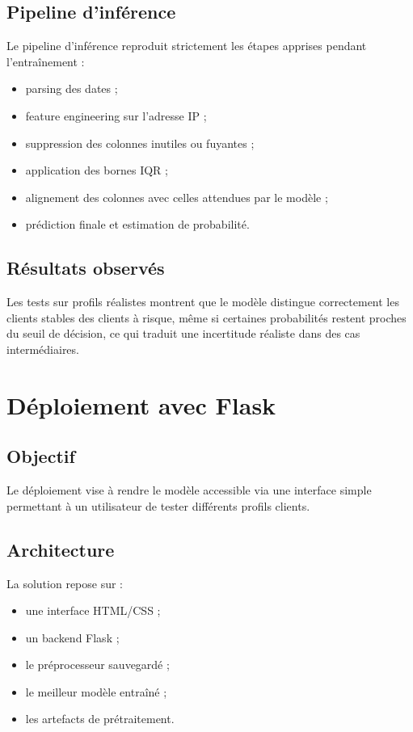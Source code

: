 \documentclass[11pt,a4paper]{article}
\begin{document}
\subsection{Pipeline d’inférence}
Le pipeline d’inférence reproduit strictement les étapes apprises pendant l’entraînement :
\begin{itemize}
    \item parsing des dates ;
    \item feature engineering sur l’adresse IP ;
    \item suppression des colonnes inutiles ou fuyantes ;
    \item application des bornes IQR ;
    \item alignement des colonnes avec celles attendues par le modèle ;
    \item prédiction finale et estimation de probabilité.
\end{itemize}

\subsection{Résultats observés}
Les tests sur profils réalistes montrent que le modèle distingue correctement les clients stables des clients à risque, même si certaines probabilités restent proches du seuil de décision, ce qui traduit une incertitude réaliste dans des cas intermédiaires.

\section{Déploiement avec Flask}

\subsection{Objectif}
Le déploiement vise à rendre le modèle accessible via une interface simple permettant à un utilisateur de tester différents profils clients.

\subsection{Architecture}
La solution repose sur :
\begin{itemize}
    \item une interface HTML/CSS ;
    \item un backend Flask ;
    \item le préprocesseur sauvegardé ;
    \item le meilleur modèle entraîné ;
    \item les artefacts de prétraitement.
\end{itemize}
\end{document}

